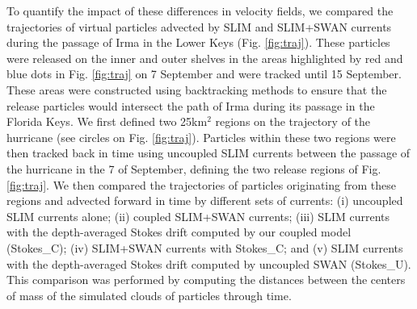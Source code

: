 \documentclass[11pt,a4paper]{article}
\begin{document}
To quantify the impact of these differences in velocity fields, we compared the trajectories of virtual particles advected by SLIM and SLIM+SWAN currents during the passage of Irma in the Lower Keys (Fig. \ref{fig:traj}). These particles were released on the inner and outer shelves in the areas highlighted by red and blue dots in Fig. \ref{fig:traj} on 7 September and were tracked until 15 September. These areas were constructed using backtracking methods \citep{dobbelaerereport} to ensure that the release particles would intersect the path of Irma during its passage in the Florida Keys. We first defined two 25km$^\text{2}$ regions on the trajectory of the hurricane (see circles on Fig. \ref{fig:traj}). Particles within these two regions were then tracked back in time using uncoupled SLIM currents between the passage of the hurricane in the 7 of September, defining the two release regions of Fig. \ref{fig:traj}. We then compared the trajectories of particles originating from these regions and advected forward in time by different sets of currents: (i) uncoupled SLIM currents alone; (ii) coupled SLIM+SWAN currents; (iii) SLIM currents with the depth-averaged Stokes drift computed by our coupled model (Stokes\_C); (iv) SLIM+SWAN currents with Stokes\_C; and (v) SLIM currents with the depth-averaged Stokes drift computed by uncoupled SWAN (Stokes\_U). This comparison was performed by computing the distances between the centers of mass of the simulated clouds of particles through time.
\end{document}
